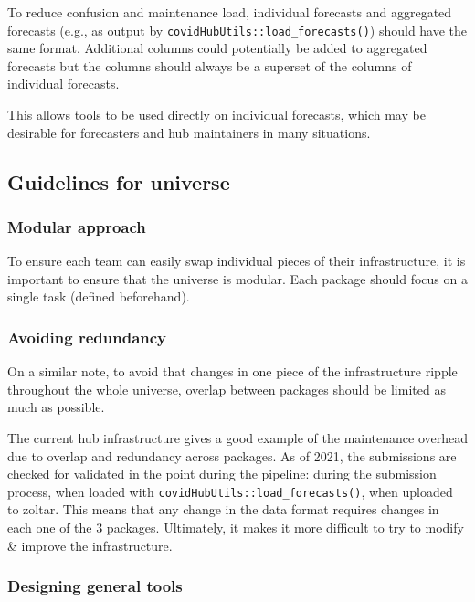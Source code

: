 \documentclass[
  letterpaper,
  DIV=11,
  numbers=noendperiod]{scrartcl}
\begin{document}
To reduce confusion and maintenance load, individual forecasts and
aggregated forecasts (e.g., as output by
\texttt{covidHubUtils::load\_forecasts()}) should have the same format.
Additional columns could potentially be added to aggregated forecasts
but the columns should always be a superset of the columns of individual
forecasts.

This allows tools to be used directly on individual forecasts, which may
be desirable for forecasters and hub maintainers in many situations.

\hypertarget{guidelines-for-universe}{%
\subsection{Guidelines for universe}\label{guidelines-for-universe}}

\hypertarget{modular-approach}{%
\subsubsection{Modular approach}\label{modular-approach}}

To ensure each team can easily swap individual pieces of their
infrastructure, it is important to ensure that the universe is modular.
Each package should focus on a single task (defined beforehand).

\hypertarget{avoiding-redundancy}{%
\subsubsection{Avoiding redundancy}\label{avoiding-redundancy}}

On a similar note, to avoid that changes in one piece of the
infrastructure ripple throughout the whole universe, overlap between
packages should be limited as much as possible.

The current hub infrastructure gives a good example of the maintenance
overhead due to overlap and redundancy across packages. As of 2021, the
submissions are checked for validated in the point during the pipeline:
during the submission process, when loaded with
\texttt{covidHubUtils::load\_forecasts()}, when uploaded to zoltar. This
means that any change in the data format requires changes in each one of
the 3 packages. Ultimately, it makes it more difficult to try to modify
\& improve the infrastructure.

\hypertarget{designing-general-tools}{%
\subsubsection{Designing general tools}\label{designing-general-tools}}
\end{document}
